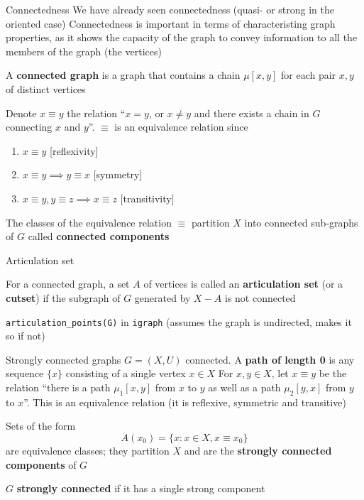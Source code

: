 \documentclass[aspectratio=43]{beamer}
\begin{document}
\begin{frame}{Connectedness}
We have already seen connectedness (quasi- or strong in the oriented case)
\vfill
Connectedness is important in terms of characteristing graph properties, as it shows the capacity of the graph to convey information to all the members of the graph (the vertices)
\end{frame}


\begin{frame}
	\begin{definition}
	A \textbf{connected graph} is a graph that contains a chain $\mu[x,y]$ for each pair $x,y$ of distinct vertices
	\end{definition}
	\vfill
	Denote $x\equiv y$ the relation  ``$x=y$, or $x\neq y$ and there exists a chain in $G$ connecting $x$ and $y$''. $\equiv$ is an equivalence relation since
	\begin{enumerate}
		\item $x\equiv y$ \hfill[reflexivity]
		\item $x\equiv y\implies y\equiv x$ \hfill[symmetry]
		\item $x\equiv y, y\equiv z\implies x\equiv z$ \hfill[transitivity]
	\end{enumerate}
	\begin{definition}
	The classes of the equivalence relation $\equiv$ partition $X$ into connected sub-graphs of $G$ called \textbf{connected components}
	\end{definition}
	\end{frame}
	
\begin{frame}{Articulation set} 
	\begin{definition}
	For a connected graph, a set $A$ of vertices is called an \textbf{articulation set} (or a \textbf{cutset}) if the subgraph of $G$ generated by $X-A$ is not connected
	\end{definition}
	\vfill
	{\tt articulation\_points(G)} in {\tt igraph} (assumes the graph is undirected, makes it so if not)
\end{frame}

	
	\begin{frame}{Strongly connected graphs}
		$G=(X,U)$ connected. 
		A \textbf{path of length 0} is any sequence $\{x\}$ consisting of a single vertex $x\in X$
		\vfill
		For $x,y\in X$, let $x\equiv y$ be the relation ``there is a path $\mu_1[x,y]$ from $x$ to $y$ as well as a path $\mu_2[y,x]$ from $y$ to $x$''. This is an equivalence relation (it is reflexive, symmetric and transitive)
		\vfill
		\begin{definition}\label{def:strong_components}
		Sets of the form 
		\[
		A(x_0)=\{x:x\in X, x\equiv x_0\}	
		\]
		are equivalence classes; they partition $X$ and are the \textbf{strongly connected components} of $G$	
		\end{definition}
		\vfill
		\begin{definition}
		\label{def:strongly_connected_graph}
		$G$ \textbf{strongly connected} if it has a single strong component
		\end{definition}
\end{frame}
		
\end{document}
